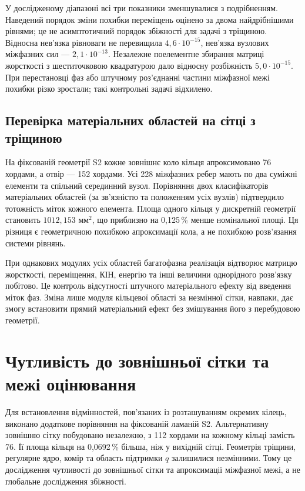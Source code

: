 У дослідженому діапазоні всі три показники зменшувалися з подрібненням. Наведений порядок зміни похибки переміщень оцінено за двома найдрібнішими рівнями; це не асимптотичний порядок збіжності для задачі з тріщиною. Відносна нев'язка рівноваги не перевищила $4{,}6\cdot10^{-15}$, нев'язка вузлових міжфазних сил --- $2{,}1\cdot10^{-13}$. Незалежне поелементне збирання матриці жорсткості з шеститочковою квадратурою дало відносну розбіжність $5{,}0\cdot10^{-15}$. При перестановці фаз або штучному роз'єднанні частини міжфазної межі похибки різко зростали; такі контрольні задачі відхилено.

\subsection{Перевірка матеріальних областей на сітці з тріщиною}

На фіксованій геометрії S2 кожне зовнішнє коло кільця апроксимовано 76 хордами, а отвір --- 152 хордами. Усі 228 міжфазних ребер мають по два суміжні елементи та спільний серединний вузол. Порівняння двох класифікаторів матеріальних областей (за зв'язністю та положенням усіх вузлів) підтвердило тотожність міток кожного елемента. Площа одного кільця у дискретній геометрії становить $1012{,}153$ мм$^2$, що приблизно на 0,125\,\% менше номінальної площі. Ця різниця є геометричною похибкою апроксимації кола, а не похибкою розв'язання системи рівнянь.

При однакових модулях усіх областей багатофазна реалізація відтворює матрицю жорсткості, переміщення, КІН, енергію та інші величини однорідного розв'язку побітово. Це контроль відсутності штучного матеріального ефекту від введення міток фаз. Зміна лише модуля кільцевої області за незмінної сітки, навпаки, дає змогу встановити прямий матеріальний ефект без змішування його з перебудовою геометрії.

\section{Чутливість до зовнішньої сітки та межі оцінювання}
\label{sec:ver-exterior}

Для встановлення відмінностей, пов'язаних із розташуванням окремих кілець, виконано додаткове порівняння на фіксованій ламаній S2. Альтернативну зовнішню сітку побудовано незалежно, з 112 хордами на кожному кільці замість 76. Її площа кільця на 0,0692\,\% більша, ніж у вихідній сітці. Геометрія тріщини, регулярне ядро, комір та область підтримки $q$ залишилися незмінними. Тому це дослідження чутливості до зовнішньої сітки та апроксимації міжфазної межі, а не глобальне дослідження збіжності.

